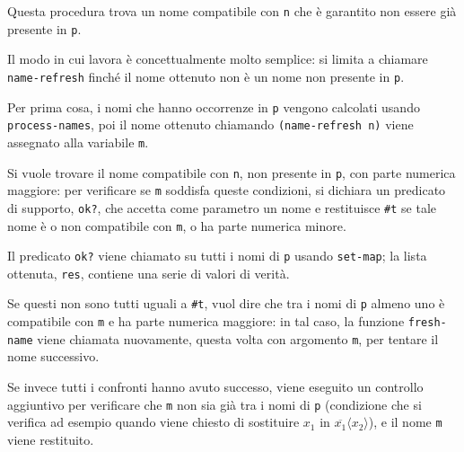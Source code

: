 Questa procedura trova un nome compatibile con \lstinline{n} che \`e
garantito non essere gi\`a presente in \lstinline{p}.

Il modo in cui lavora \`e concettualmente molto semplice: si limita a
chiamare \lstinline{name-refresh} finch\'e il nome ottenuto non \`e
un nome non presente in \lstinline{p}.

Per prima cosa, i nomi che hanno occorrenze in \lstinline{p} vengono
calcolati usando \lstinline{process-names}, poi il nome ottenuto chiamando
\lstinline{(name-refresh n)} viene assegnato alla variabile \lstinline{m}.

Si vuole trovare il nome compatibile con \lstinline{n}, non presente in
\lstinline{p}, con parte numerica maggiore: per verificare se
\lstinline{m} soddisfa queste condizioni, si dichiara un predicato di
supporto, \lstinline{ok?}, che accetta come parametro un nome e restituisce
\lstinline{#t} se tale nome \`e o non compatibile con \lstinline{m}, o ha
parte numerica minore.

Il predicato \lstinline{ok?} viene chiamato su tutti i nomi di \lstinline{p}
usando \lstinline{set-map}; la lista ottenuta, \lstinline{res}, contiene
una serie di valori di verit\`a.

Se questi non sono tutti uguali a \lstinline{#t}, vuol dire che tra i nomi
di \lstinline{p} almeno uno \`e compatibile con \lstinline{m} e ha parte
numerica maggiore: in tal caso, la funzione \lstinline{fresh-name} viene
chiamata nuovamente, questa volta con argomento \lstinline{m}, per tentare
il nome successivo.

Se invece tutti i confronti hanno avuto successo, viene eseguito un
controllo aggiuntivo per verificare che \lstinline{m} non sia gi\`a tra
i nomi di \lstinline{p} (condizione che si verifica ad esempio quando viene
chiesto di sostituire $x_1$ in $\overline{x_1}\langle x_2\rangle$), e il
nome \lstinline{m} viene restituito.
